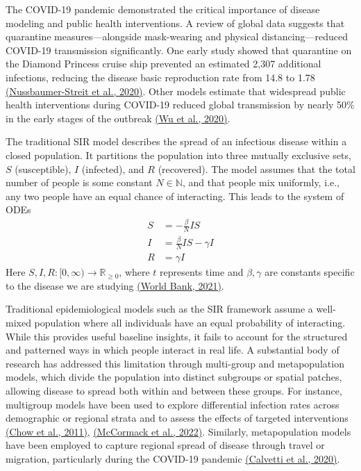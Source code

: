 \documentclass[a4paper]{article}
\begin{document}
	The COVID-19 pandemic demonstrated the critical importance of disease modeling and public health interventions. A review of global data suggests that quarantine measures—alongside mask-wearing and physical distancing—reduced COVID-19 transmission significantly. One early study showed that quarantine on the Diamond Princess cruise ship prevented an estimated 2,307 additional infections, reducing the disease basic reproduction rate from 14.8 to 1.78 \href{https://www.ncbi.nlm.nih.gov/pmc/articles/PMC7141753/}{(Nussbaumer-Streit et al., 2020)}. Other models estimate that widespread public health interventions during COVID-19 reduced global transmission by nearly 50\% in the early stages of the outbreak \href{https://www.nature.com/articles/s41591-020-0822-7}{(Wu et al., 2020)}.
	
	The traditional SIR model describes the spread of an infectious disease within a closed population. It partitions the population into three mutually exclusive sets, $S$ (susceptible), $I$ (infected), and $R$ (recovered). The model assumes that the total number of people is some constant $N \in \mathbb{N}$, and that people mix uniformly, i.e., any two people have an equal chance of interacting. This leads to the system of ODEs
	\begin{align*}
		S &= -\frac{\beta}{N}IS\\
		I &= \frac{\beta}{N}IS - \gamma I\\
		R &= \gamma I
	\end{align*}
	Here $S, I, R: [0, \infty) \longrightarrow \mathbb{R}_{\geq 0}$, where $t$ represents time and $\beta, \gamma$ are constants specific to the disease we are studying \href{https://documents1.worldbank.org/curated/en/888341625223820901/pdf/An-Introduction-to-Deterministic-Infectious-Disease-Models.pdf}{(World Bank, 2021)}.
	
	Traditional epidemiological models such as the SIR framework assume a well-mixed population where all individuals have an equal probability of interacting. While this provides useful baseline insights, it fails to account for the structured and patterned ways in which people interact in real life. A substantial body of research has addressed this limitation through multi-group and metapopulation models, which divide the population into distinct subgroups or spatial patches, allowing disease to spread both within and between these groups. For instance, multigroup models have been used to explore differential infection rates across demographic or regional strata and to assess the effects of targeted interventions \href{https://www.sciencedirect.com/science/article/abs/pii/S0022519311004760}{(Chow et al., 2011)}, \href{https://pmc.ncbi.nlm.nih.gov/articles/PMC9698251}{(McCormack et al., 2022)}. Similarly, metapopulation models have been employed to capture regional spread of disease through travel or migration, particularly during the COVID-19 pandemic \href{https://www.frontiersin.org/journals/physics/articles/10.3389/fphy.2020.00261/full}{(Calvetti et al., 2020)}.
	
\end{document}
